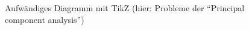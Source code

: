 \begin{figure}[hp]
	\centering%
	\hfill%
	\caption{Aufwändiges Diagramm mit TikZ (hier: Probleme der \enquote{Principal component analysis})}%
	\label{fig:pca}%
\end{figure}
